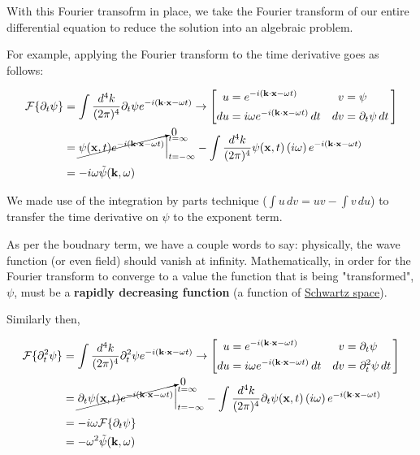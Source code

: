 With this Fourier transofrm in place, we take the Fourier transform of our entire differential equation to reduce
the solution into an algebraic problem.

For example, applying the Fourier transform to the time derivative goes as follows:

\begin{align*}
\mathcal{F}\{ \partial_t \psi \} &=
    \int \frac{d^4k}{(2\pi)^4} \partial_t \psi e^{-i(\boldsymbol{\mathbf{k}}\cdot\boldsymbol{\mathbf{x}} - \omega t)}
\rightarrow
\left[
    \begin{alignedat}{2}
        u  &= e^{-i(\boldsymbol{\mathbf{k}}\cdot\boldsymbol{\mathbf{x}} - \omega t)}                \quad & v  &= \psi \\
        du &= i\omega e^{-i(\boldsymbol{\mathbf{k}}\cdot\boldsymbol{\mathbf{x}} - \omega t)} \, dt  \quad & dv &= \partial_t \psi \, dt
    \end{alignedat}\,
\right] \\
&= \cancelto{0}{ \psi(\boldsymbol{\mathbf{x}}, t) e^{-i(\boldsymbol{\mathbf{k}}\cdot\boldsymbol{\mathbf{x}} - \omega t)} } \Big|_{t=-\infty}^{t=\infty}
    - \int \frac{d^4k}{(2\pi)^4} \psi(\boldsymbol{\mathbf{x}}, t) \left(i\omega\right) e^{-i(\boldsymbol{\mathbf{k}}\cdot\boldsymbol{\mathbf{x}} - \omega t)} \\
&= -i\omega \tilde{\psi} (\boldsymbol{\mathbf{k}}, \omega)
\end{align*}

We made use of the integration by parts technique ($\int u \, dv = uv - \int v \, du$) to transfer the time derivative
on $\psi$ to the exponent term.

As per the boudnary term, we have a couple words to say: physically, the wave function (or even field) should vanish at infinity.
Mathematically, in order for the Fourier transform to converge to a value the function that is being "transformed", $\psi$,
must be a \textbf{rapidly decreasing function} (a function of \href{https://en.wikipedia.org/wiki/Schwartz_space}{Schwartz space}).

Similarly then,

\begin{align*}
\mathcal{F}\{ \partial_{t}^2 \psi \} &=
    \int \frac{d^4k}{(2\pi)^4} \partial_{t}^{2} \psi e^{-i(\boldsymbol{\mathbf{k}}\cdot\boldsymbol{\mathbf{x}} - \omega t)}
\rightarrow
\left[
    \begin{alignedat}{2}
        u  &= e^{-i(\boldsymbol{\mathbf{k}}\cdot\boldsymbol{\mathbf{x}} - \omega t)}                \quad & v  &= \partial_t \psi \\
        du &= i\omega e^{-i(\boldsymbol{\mathbf{k}}\cdot\boldsymbol{\mathbf{x}} - \omega t)} \, dt  \quad & dv &= \partial_{t}^{2} \psi \, dt
    \end{alignedat}\,
\right] \\
&= \cancelto{0}{ \partial _t \psi(\boldsymbol{\mathbf{x}}, t) e^{-i(\boldsymbol{\mathbf{k}}\cdot\boldsymbol{\mathbf{x}} - \omega t)} } \Big|_{t=-\infty}^{t=\infty}
    - \int \frac{d^4k}{(2\pi)^4} \partial_t \psi(\boldsymbol{\mathbf{x}}, t) \left(i\omega\right) e^{-i(\boldsymbol{\mathbf{k}}\cdot\boldsymbol{\mathbf{x}} - \omega t)} \\
&= -i\omega \mathcal{F}\{ \partial_t \psi \} \\
&= - \omega^2 \tilde{\psi} (\boldsymbol{\mathbf{k}}, \omega)
\end{align*}

